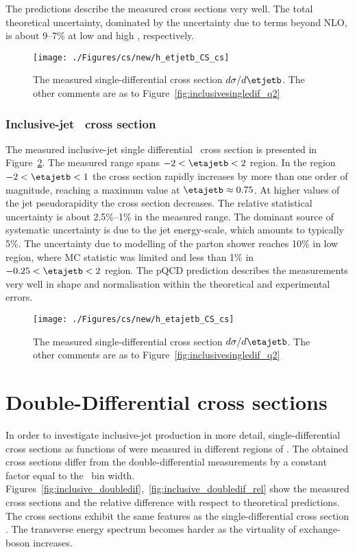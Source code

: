 The predictions describe the measured cross sections very well. The total theoretical uncertainty, dominated by the uncertainty due to terms beyond NLO, is about 9--7\% at low and high \etjetb, respectively. 
\begin{figure}[p]
	\centering
		\texttt{[image: ./Figures/cs/new/h\_etjetb\_CS\_cs]}
	\caption{The measured single-differential cross section $d\sigma/d\etjetb$. The other comments are as to Figure~\ref{fig:inclusivesingledif_q2}}
	\label{fig:inclusivesingledif_et}
\end{figure}

\subsubsection*{Inclusive-jet \dsdetajetb~cross section}
The measured inclusive-jet single differential \dsdetajetb~cross section is presented in Figure~\ref{fig:inclusivesingledif_eta}. The measured range spans $-2 < \etajetb < 2$ region. In the region  $-2 < \etajetb < 1$ the cross section rapidly increases by more than one order of magnitude, reaching a maximum value at $\etajetb \approx 0.75$. At higher values of the jet pseudorapidity the cross section decreases. The relative statistical uncertainty is about 2.5\%--1\% in the measured range. The dominant source of systematic uncertainty is due to the jet energy-scale, which amounts to typically 5\%. The uncertainty due to modelling of the parton shower reaches 10\% in low \etajetb region, where MC statistic was limited and less than 1\% in $-0.25 < \etajetb < 2$ region. The pQCD prediction describes the measurements very well in shape and normalisation within the theoretical and experimental errors.
\begin{figure}[p]
	\centering
		\texttt{[image: ./Figures/cs/new/h\_etajetb\_CS\_cs]}
	\caption{The measured single-differential cross section $d\sigma/d\etajetb$. The other comments are as to Figure~\ref{fig:inclusivesingledif_q2}}
	\label{fig:inclusivesingledif_eta}
\end{figure}

\section{Double-Differential cross sections}
In order to investigate inclusive-jet production in more detail, single-differential cross sections as functions of \etjetb were measured in different regions of \qsq. The obtained cross sections differ from the double-differential measurements by a constant factor equal to the \qsq~bin width. Figures~\ref{fig:inclusive_doubledif},~\ref{fig:inclusive_doubledif_rel} show the measured cross sections and the relative difference with respect to theoretical predictions. The cross sections exhibit the same features as the single-differential cross section \dsdetjetb. The transverse energy spectrum becomes harder as the virtuality of exchange-boson increases.

